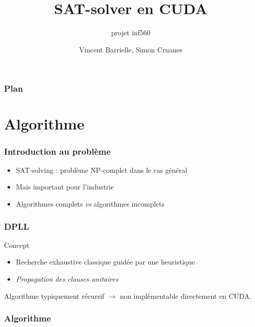 \documentclass{beamer}
\newcommand{\cuda}{\textsc{CUDA}}
\begin{document}

\author{Vincent Barrielle, Simon Cruanes}
\lstset{language=C,showstringspaces=false}	
\title{SAT-solver en \cuda}
\subtitle{projet inf560}



\begin{frame}
\titleframe
\titlepage
\end{frame}

\begin{frame}
\frametitle{Plan}
\small \tableofcontents%
\normalsize
\end{frame}

\section{Algorithme}
\begin{frame}
\frametitle{Introduction au problème}
\begin{itemize}
    \item SAT-solving : problème NP-complet dans le cas général
    \pause
    \item Mais important pour l'industrie
    \pause
    \item Algorithmes complets \emph{vs} algorithmes incomplets %
\end{itemize}
\end{frame}

\begin{frame}
\frametitle{DPLL}
\begin{block}{Concept}
\begin{itemize}
    \item Recherche exhaustive classique guidée par une heuristique
    \pause
    \item \emph{Propagation des clauses unitaires}
\end{itemize}
\end{block}

\begin{block}{}
    Algorithme typiquement récursif $\rightarrow$ non implémentable directement en \cuda.
\end{block}
\end{frame}


\frametitle{Algorithme}
\end{document}
